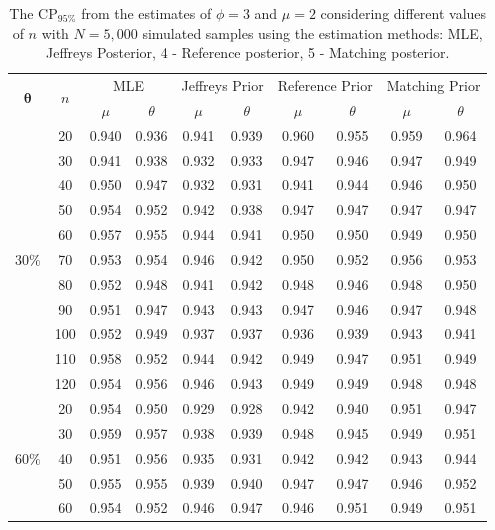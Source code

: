 \documentclass[]{interact}
\theoremstyle{plain}%
\theoremstyle{definition}
\theoremstyle{remark}
\begin{document}
\begin{table}[!h]
\centering
\caption{The $\mbox{CP}_{95\%}$ from the estimates of $\phi=3$ and $\mu=2$ considering different values of $n$  with $N=5,000$ simulated samples using the estimation methods:  MLE,  Jeffreys Posterior, 4 - Reference posterior, 5 - Matching posterior.}
\begin{tabular}{c|c|c|c|c|c|c|c|c|c}
\hline
\multirow{2}{*}{$\boldsymbol{\theta}$ }  & \multirow{2}{*}{$n$ }  & \multicolumn{2}{c|}{MLE} & \multicolumn{2}{c|}{Jeffreys Prior} & \multicolumn{2}{c|}{Reference Prior}  & \multicolumn{2}{c}{Matching Prior} \\  &  &    $\mu$ & $\theta$ & $\mu$ & $\theta$ & $\mu$ & $\theta$  & $\mu$ & $\theta$ \\
\hline
\multirow{11}{*}{$30\%$} 
&  20 & 0.940 & 0.936 & 0.941 & 0.939 & 0.960 & 0.955 & 0.959 & 0.964 \\
&  30 & 0.941 & 0.938 & 0.932 & 0.933 & 0.947 & 0.946 & 0.947 & 0.949 \\
&  40 & 0.950 & 0.947 & 0.932 & 0.931 & 0.941 & 0.944 & 0.946 & 0.950 \\
&  50 & 0.954 & 0.952 & 0.942 & 0.938 & 0.947 & 0.947 & 0.947 & 0.947 \\
&  60 & 0.957 & 0.955 & 0.944 & 0.941 & 0.950 & 0.950 & 0.949 & 0.950 \\
&  70 & 0.953 & 0.954 & 0.946 & 0.942 & 0.950 & 0.952 & 0.956 & 0.953 \\
&  80 & 0.952 & 0.948 & 0.941 & 0.942 & 0.948 & 0.946 & 0.948 & 0.950 \\
&  90 & 0.951 & 0.947 & 0.943 & 0.943 & 0.947 & 0.946 & 0.947 & 0.948 \\
&  100 & 0.952 & 0.949 & 0.937 & 0.937 & 0.936 & 0.939 & 0.943 & 0.941 \\
&  110 & 0.958 & 0.952 & 0.944 & 0.942 & 0.949 & 0.947 & 0.951 & 0.949 \\
&  120 & 0.954 & 0.956 & 0.946 & 0.943 & 0.949 & 0.949 & 0.948 & 0.948 \\ \hline
\multirow{11}{*}{$60\%$}
&  20 & 0.954 & 0.950 & 0.929 & 0.928 & 0.942 & 0.940 & 0.951 & 0.947 \\
&  30 & 0.959 & 0.957 & 0.938 & 0.939 & 0.948 & 0.945 & 0.949 & 0.951 \\
&  40 & 0.951 & 0.956 & 0.935 & 0.931 & 0.942 & 0.942 & 0.943 & 0.944 \\
&  50 & 0.955 & 0.955 & 0.939 & 0.940 & 0.947 & 0.947 & 0.946 & 0.952 \\
&  60 & 0.954 & 0.952 & 0.946 & 0.947 & 0.946 & 0.951 & 0.949 & 0.951 \\

\end{tabular}
\end{table}
\end{document}
